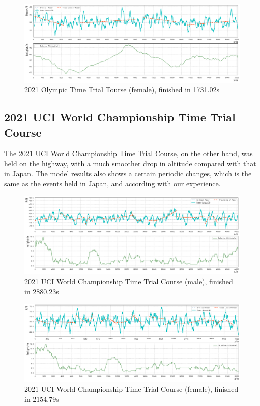 \documentclass{mcmthesis}
\begin{document}
\begin{figure}[H]
\small
\centering
\includegraphics[width=13.5cm]{mcmthesis/figures/jap-w.png}
\caption{2021 Olympic Time Trial Tourse (female), finished in 1731.02s} 
\end{figure}


\subsection{2021 UCI World Championship Time Trial Course}
The 2021 UCI World Championship Time Trial Course, on the other hand, was held on the highway, with a much smoother drop in altitude compared with that in Japan. The model results also shows a certain periodic changes, which is the same as the events held in Japan, and according with our experience.
\begin{figure}[H]
\small
\centering
\includegraphics[width=13.5cm]{mcmthesis/figures/bel-m.png}
\caption{2021 UCI World Championship Time Trial Course (male), finished in 2880.23s} 
\end{figure}

\begin{figure}[H]
\small
\centering
\includegraphics[width=13.5cm]{mcmthesis/figures/bel-w.png}
\caption{2021 UCI World Championship Time Trial Course (female), finished in 2154.79s} 
\end{figure}
\end{document}
